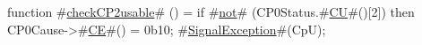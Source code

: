 function #\hyperref[zcheckCPtwousable]{checkCP2usable}# ()  =
  if #\hyperref[znot]{not}# (CP0Status.#\hyperref[zCU]{CU}#()[2]) then {
    CP0Cause->#\hyperref[zCE]{CE}#() = 0b10;
    #\hyperref[zSignalException]{SignalException}#(CpU);
  }
